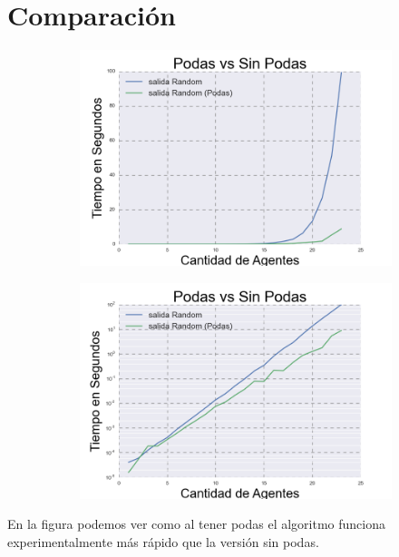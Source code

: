 \section{Comparación}

\begin{figure}[h]
\begin{subfigure}{0.5\textwidth}
\includegraphics[scale=0.45]{Vs.png}
\end{subfigure}
\end{figure}

\begin{figure}[h]
\begin{subfigure}{0.5\textwidth}
\includegraphics[scale=0.45]{VsLog.png}
\end{subfigure}
\end{figure}


	En la figura podemos ver como al tener podas el algoritmo funciona experimentalmente más rápido que la versión sin podas.